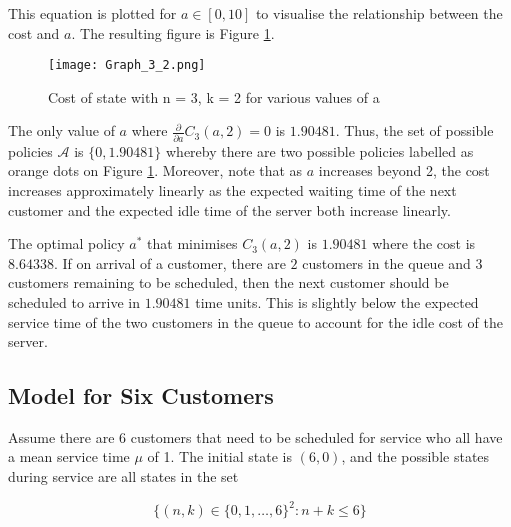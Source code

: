 This equation is plotted for $a \in [0, 10]$ to visualise the relationship between the cost and $a$. The resulting figure is Figure \ref{Graph_3_2}.

\begin{figure}[htb]
	\centering
	\texttt{[image: Graph\_3\_2.png]}
	\caption{Cost of state with n = 3, k = 2 for various values of a}
	\label{Graph_3_2}
\end{figure}

The only value of $a$ where $\frac{\partial}{\partial a} C_{3} (a, 2) = 0$ is $1.90481$. Thus, the set of possible policies $\mathcal{A}$ is $\{ 0, 1.90481 \}$ whereby there are two possible policies labelled as orange dots on Figure \ref{Graph_3_2}. Moreover, note that as $a$ increases beyond 2, the cost increases approximately linearly as the expected waiting time of the next customer and the expected idle time of the server both increase linearly.

The optimal policy $a^{*}$ that minimises $C_{3} (a, 2)$ is $1.90481$ where the cost is $8.64338$. If on arrival of a customer, there are $2$ customers in the queue and $3$ customers remaining to be scheduled, then the next customer should be scheduled to arrive in $1.90481$ time units. This is slightly below the expected service time of the two customers in the queue to account for the idle cost of the server.

\subsection{Model for Six Customers}

Assume there are 6 customers that need to be scheduled for service who all have a mean service time $\mu$ of 1. The initial state is $(6, 0)$, and the possible states during service are all states in the set

\begin{equation}
	\Big\{ (n, k) \in \{ 0, 1, \ldots, 6 \}^{2} : n + k \leq 6 \Big\}
\end{equation}

